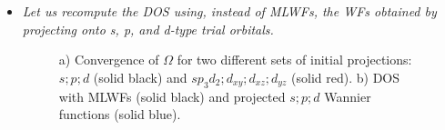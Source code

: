 \begin{itemize}
{{}}
With this choice the minimization converges much more rapidly as can be seen in Fig.~\ref{fig8.4}-(a).
\item {\it Let us recompute the DOS using, instead of MLWFs, the WFs obtained by projecting onto s, p, and d-type trial orbitals.}
\begin{figure}[h!]
\centering
{}
\centering
{}
\caption{a) Convergence of $\Omega$ for two different sets of initial projections: $s;p;d$ (solid black) and $sp_3d_2;d_{xy};d_{xz};d_{yz}$ (solid red). b) DOS with MLWFs (solid black) and projected $s;p;d$ Wannier functions (solid blue).}\label{fig8.4}
\end{figure}
\end{itemize}

\newpage
